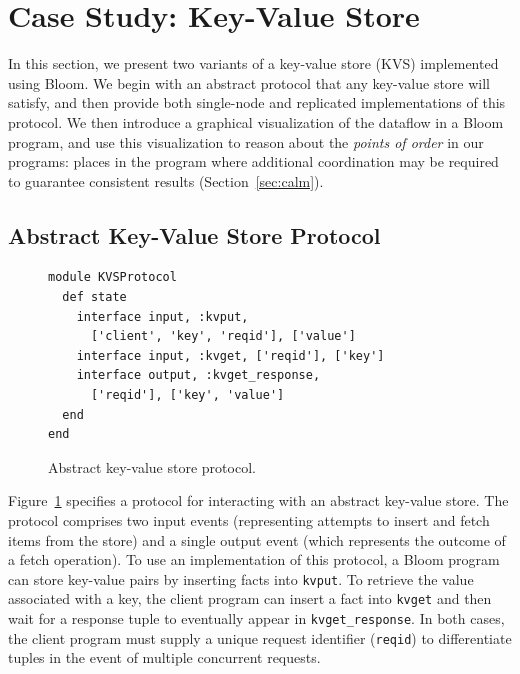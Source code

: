 \section{Case Study: Key-Value Store}
\label{sec:kvs}
In this section, we present two variants of a key-value store (KVS) implemented
using Bloom. We begin with an abstract protocol that any key-value store will
satisfy, and then provide both single-node and replicated implementations of
this protocol. We then introduce a graphical visualization of the dataflow in a
Bloom program, and use this visualization to reason about the \emph{points of
  order} in our programs: places in the program where additional coordination
may be required to guarantee consistent results (Section~\ref{sec:calm}).

\subsection{Abstract Key-Value Store Protocol}

\begin{figure}[t]
\begin{scriptsize}
\begin{lstlisting}
module KVSProtocol
  def state
    interface input, :kvput, 
      ['client', 'key', 'reqid'], ['value']
    interface input, :kvget, ['reqid'], ['key']
    interface output, :kvget_response, 
      ['reqid'], ['key', 'value']
  end
end
\end{lstlisting}
\centering
\vspace{-10pt}
\caption{Abstract key-value store protocol.}
\label{fig:kvs-proto}
\end{scriptsize}
\vspace{-2pt}
\end{figure}

Figure~\ref{fig:kvs-proto} specifies a protocol for interacting with an abstract
key-value store. The protocol comprises two input events (representing attempts
to insert and fetch items from the store) and a single output event (which
represents the outcome of a fetch operation). To use an implementation of this
protocol, a Bloom program can store key-value pairs by inserting facts into
\texttt{kvput}. To retrieve the value associated with a key, the client program
can insert a fact into \texttt{kvget} and then wait for a response tuple to
eventually appear in \texttt{kvget\_response}. In both cases, the client program
must supply a unique request identifier (\texttt{reqid}) to differentiate tuples
in the event of multiple concurrent requests.


